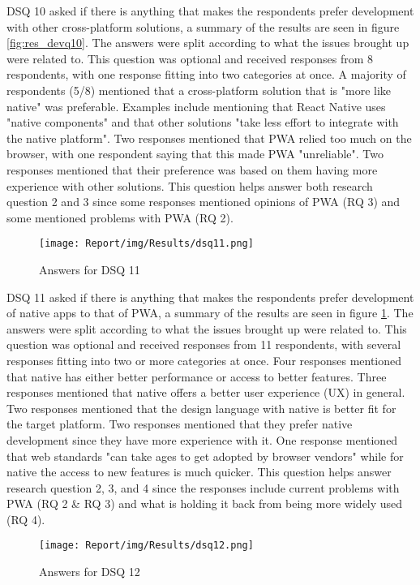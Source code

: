 \documentclass[a4paper,12pt]{article}
\begin{document}
\newpage
DSQ 10 asked if there is anything that makes the respondents prefer development with other cross-platform solutions, a summary of the results are seen in figure \ref{fig:res_devq10}. The answers were split according to what the issues brought up were related to. This question was optional and received responses from 8 respondents, with one response fitting into two categories at once. A majority of respondents (5/8) mentioned that a cross-platform solution that is "more like native" was preferable. Examples include mentioning that React Native uses "native components" and that other solutions "take less effort to integrate with the native platform". Two responses mentioned that PWA relied too much on the browser, with one respondent saying that this made PWA "unreliable". Two responses mentioned that their preference was  based on them having more experience with other solutions. This question helps answer both research question 2 and 3 since some responses mentioned opinions of PWA (RQ 3) and some mentioned problems with PWA (RQ 2).

\begin{figure}[ht!]
    \centering
    \texttt{[image: Report/img/Results/dsq11.png]}
    \caption{Answers for DSQ 11}
    \label{fig:res_devq11}
\end{figure}

DSQ 11 asked if there is anything that makes the respondents prefer development of native apps to that of PWA, a summary of the results are seen in figure \ref{fig:res_devq11}. The answers were split according to what the issues brought up were related to. This question was optional and received responses from 11 respondents, with several responses fitting into two or more categories at once. Four responses mentioned that native has either better performance or access to better features. Three responses mentioned that native offers a better user experience (UX) in general. Two responses mentioned that the design language with native is better fit for the target platform. Two responses mentioned that they prefer native development since they have more experience with it. One response mentioned that web standards "can take ages to get adopted by browser vendors" while for native the access to new features is much quicker. This question helps answer research question 2, 3, and 4 since the responses include current problems with PWA (RQ 2 \& RQ 3) and what is holding it back from being more widely used (RQ 4).

\begin{figure}[ht!]
    \centering
    \texttt{[image: Report/img/Results/dsq12.png]}
    \caption{Answers for DSQ 12}
    \label{fig:res_devq12}
\end{figure}
\end{document}
